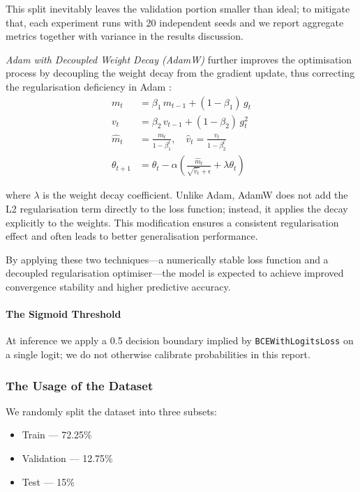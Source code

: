 \documentclass[12pt]{article}
\begin{document}
This split inevitably leaves the validation portion smaller than ideal; to mitigate that, each experiment runs with 20 independent seeds and we report aggregate metrics together with variance in the results discussion.

\textit{Adam with Decoupled Weight Decay (AdamW)} further improves the optimisation process by decoupling the weight decay from the gradient update, thus correcting the regularisation deficiency in Adam \cite{loshchilov2019adamw}:
\begin{equation}
\begin{aligned}
m_t &= \beta_1 \, m_{t-1} + (1 - \beta_1) \, g_t \\
v_t &= \beta_2 \, v_{t-1} + (1 - \beta_2) \, g_t^2 \\
\hat{m}_t &= \frac{m_t}{1 - \beta_1^t}, \quad
\hat{v}_t = \frac{v_t}{1 - \beta_2^t} \\
\theta_{t+1} &= \theta_t - \alpha \left( \frac{\hat{m}_t}{\sqrt{\hat{v}_t} + \epsilon} + \lambda \theta_t \right)
\end{aligned}
\end{equation}

where $\lambda$ is the weight decay coefficient.  
Unlike Adam, AdamW does not add the L2 regularisation term directly to the loss function; instead, it applies the decay explicitly to the weights. This modification ensures a consistent regularisation effect and often leads to better generalisation performance.

By applying these two techniques\;---\;a numerically stable loss function and a decoupled regularisation optimiser\;---\;the model is expected to achieve improved convergence stability and higher predictive accuracy.

\paragraph{The Sigmoid Threshold}

At inference we apply a 0.5 decision boundary implied by \texttt{BCEWithLogitsLoss} on a single logit; we do not otherwise calibrate probabilities in this report.

\subsubsection{The Usage of the Dataset}

We randomly split the dataset into three subsets:

\begin{itemize}
  \item Train --- 72.25\%
  \item Validation --- 12.75\%
  \item Test --- 15\%
\end{itemize}
\end{document}
